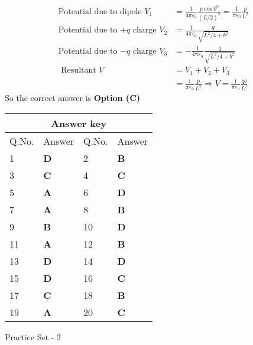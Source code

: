 \begin{enumerate}
	\begin{answer}
		\begin{align*}
		\text{Potential due to dipole }V_{1}&=\frac{1}{4 \pi \varepsilon_{0}} \frac{p \cos 0^{0}}{(L / 2)^{2}}=\frac{1}{\pi \varepsilon_{0}} \frac{p}{L^{2}}\\
		\text{Potential due to $+q$ charge }V_{2}&=\frac{1}{4 \pi \varepsilon_{0}} \frac{q}{\sqrt{L^{2} / 4+b^{2}}}\\
		\text{Potential due to $-q$ charge }V_{3}&=-\frac{1}{4 \pi \varepsilon_{0}} \frac{q}{\sqrt{L^{2} / 4+b^{2}}}\\
		\text{	Resultant }V&=V_{1}+V_{2}+V_{3}\\&=\frac{1}{\pi \varepsilon_{0}} \frac{p}{L^{2}} \Rightarrow V=\frac{1}{\pi \varepsilon_{0}} \frac{q b}{L^{2}}
		\end{align*}
		So the correct answer is \textbf{Option (C)}
	\end{answer}
	
	
	
\end{enumerate}
\setlength\arrayrulewidth{1pt}
\begin{table}[H]
	\centering
	\begin{tabular}{|p{1.5cm}|p{1.5cm}||p{1.5cm}|p{1.5cm}|}
		\hline
		\multicolumn{4}{|c|}{\textbf{Answer key}}\\\hline\hline
		\rowcolor{ocrel}Q.No.&Answer&Q.No.&Answer\\\hline
		1&\textbf{D} &2&\textbf{B}\\\hline 
		3&\textbf{C} &4&\textbf{C} \\\hline
		5&\textbf{A} &6&\textbf{D} \\\hline
		7&\textbf{A}&8&\textbf{B}\\\hline
		9&\textbf{B}&10&\textbf{D}\\\hline
		11&\textbf{A} &12&\textbf{B}\\\hline
		13&\textbf{D}&14&\textbf{D}\\\hline
		15&\textbf{D}&16&\textbf{C}\\\hline
		17&\textbf{C} &18&\textbf{B}\\\hline 
		19&\textbf{A} &20&\textbf{C} \\\hline
	\end{tabular}
\end{table}
\begin{abox}
	Practice Set - 2
\end{abox}

